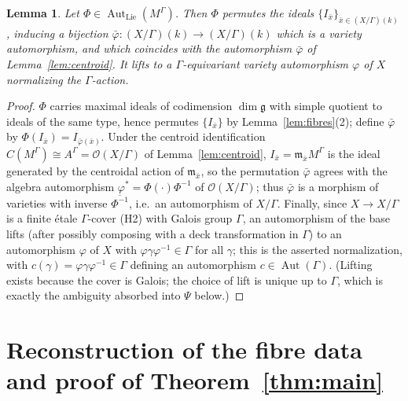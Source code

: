 \documentclass{amsart}
\newtheorem{lemma}{Lemma}
\theoremstyle{definition}
\DeclareMathOperator{\Aut}{Aut}
\newcommand{\g}{\mathfrak{g}}
\newcommand{\OO}{\mathcal{O}}
\newcommand{\M}{M}
\begin{document}
\begin{lemma}\label{lem:varietypart}
Let $\Phi\in\Aut_{\mathrm{Lie}}(\M^\Gamma)$.  Then $\Phi$ permutes the
ideals $\{I_{\bar x}\}_{\bar x\in (X/\Gamma)(k)}$, inducing a bijection
$\bar\varphi\colon(X/\Gamma)(k)\to(X/\Gamma)(k)$ which is a variety
automorphism, and which coincides with the automorphism $\bar\varphi$ of
Lemma~\ref{lem:centroid}.  It lifts to a $\Gamma$-equivariant variety
automorphism $\varphi$ of $X$ normalizing the $\Gamma$-action.
\end{lemma}
\begin{proof}
$\Phi$ carries maximal ideals of codimension $\dim\g$ with simple quotient
to ideals of the same type, hence permutes $\{I_{\bar x}\}$ by
Lemma~\ref{lem:fibres}(2); define $\bar\varphi$ by
$\Phi(I_{\bar x})=I_{\bar\varphi(\bar x)}$.  Under the centroid
identification $C(\M^\Gamma)\cong A^\Gamma=\OO(X/\Gamma)$ of
Lemma~\ref{lem:centroid}, $I_{\bar x}=\mathfrak m_{\bar x}\M^\Gamma$ is the
ideal generated by the centroidal action of $\mathfrak m_{\bar x}$, so the
permutation $\bar\varphi$ agrees with the algebra automorphism
$\varphi^*=\Phi(\cdot)\Phi^{-1}$ of $\OO(X/\Gamma)$; thus $\bar\varphi$ is
a morphism of varieties with inverse $\overline{\Phi^{-1}}$, i.e.\ an
automorphism of $X/\Gamma$.  Finally, since $X\to X/\Gamma$ is a finite
\'etale $\Gamma$-cover (H2) with Galois group $\Gamma$, an automorphism of
the base lifts (after possibly composing with a deck transformation in
$\Gamma$) to an automorphism $\varphi$ of $X$ with
$\varphi\gamma\varphi^{-1}\in\Gamma$ for all $\gamma$; this is the asserted
normalization, with $c(\gamma)=\varphi\gamma\varphi^{-1}\in\Gamma$ defining
an automorphism $c\in\Aut(\Gamma)$.  (Lifting exists because the cover is
Galois; the choice of lift is unique up to $\Gamma$, which is exactly the
ambiguity absorbed into $\Psi$ below.)
\end{proof}

\section{Reconstruction of the fibre data and proof of
Theorem~\ref{thm:main}}\label{sec:autthm}
\end{document}
